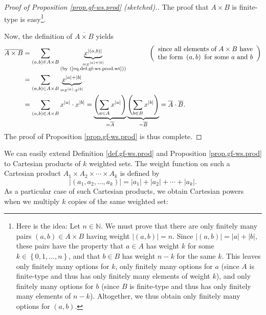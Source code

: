 \begin{proof}
[Proof of Proposition \ref{prop.gf-ws.prod} (sketched).]The proof that
$A\times B$ is finite-type is easy\footnote{Here is the idea: Let
$n\in\mathbb{N}$. We must prove that there are only finitely many pairs
$\left(  a,b\right)  \in A\times B$ having weight $\left\vert \left(
a,b\right)  \right\vert =n$. Since $\left\vert \left(  a,b\right)  \right\vert
=\left\vert a\right\vert +\left\vert b\right\vert $, these pairs have the
property that $a\in A$ has weight $k$ for some $k\in\left\{  0,1,\ldots
,n\right\}  $, and that $b\in B$ has weight $n-k$ for the same $k$. This
leaves only finitely many options for $k$, only finitely many options for $a$
(since $A$ is finite-type and thus has only finitely many elements of weight
$k$), and only finitely many options for $b$ (since $B$ is finite-type and
thus has only finitely many elements of $n-k$). Altogether, we thus obtain
only finitely many options for $\left(  a,b\right)  $.}.

Now, the definition of $\overline{A\times B}$ yields%
\begin{align*}
\overline{A\times B}  &  =\sum_{\left(  a,b\right)  \in A\times B}%
\underbrace{x^{\left\vert \left(  a,b\right)  \right\vert }}%
_{\substack{=x^{\left\vert a\right\vert +\left\vert b\right\vert }\\\text{(by
(\ref{eq.def.gf-ws.prod.wt}))}}}\ \ \ \ \ \ \ \ \ \ \left(
\begin{array}
[c]{c}%
\text{since all elements of }A\times B\text{ have}\\
\text{the form }\left(  a,b\right)  \text{ for some }a\text{ and }b
\end{array}
\right) \\
&  =\sum_{\left(  a,b\right)  \in A\times B}\underbrace{x^{\left\vert
a\right\vert +\left\vert b\right\vert }}_{=x^{\left\vert a\right\vert }\cdot
x^{\left\vert b\right\vert }}\\
&  =\sum_{\left(  a,b\right)  \in A\times B}x^{\left\vert a\right\vert }\cdot
x^{\left\vert b\right\vert }=\underbrace{\left(  \sum_{a\in A}x^{\left\vert
a\right\vert }\right)  }_{=\overline{A}}\underbrace{\left(  \sum_{b\in
B}x^{\left\vert b\right\vert }\right)  }_{=\overline{B}}=\overline{A}%
\cdot\overline{B}.
\end{align*}
The proof of Proposition \ref{prop.gf-ws.prod} is thus complete.
\end{proof}

We can easily extend Definition \ref{def.gf-ws.prod} and Proposition
\ref{prop.gf-ws.prod} to Cartesian products of $k$ weighted sets. The weight
function on such a Cartesian product $A_{1}\times A_{2}\times\cdots\times
A_{k}$ is defined by%
\begin{equation}
\left\vert \left(  a_{1},a_{2},\ldots,a_{k}\right)  \right\vert =\left\vert
a_{1}\right\vert +\left\vert a_{2}\right\vert +\cdots+\left\vert
a_{k}\right\vert . \label{eq.gf-ws.prodk.weight}%
\end{equation}
As a particular case of such Cartesian products, we obtain Cartesian powers
when we multiply $k$ copies of the same weighted set:

